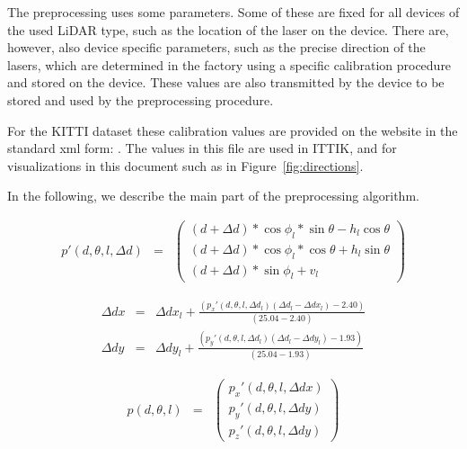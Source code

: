 \documentclass[english]{article}
\begin{document}
The preprocessing uses some parameters. Some of these are fixed for all
devices of the used LiDAR type, such as the location of the laser on the
device. There are, however, also device specific parameters, such as the
precise direction of the lasers, which are determined in the factory
using a specific calibration procedure and stored on the device. These
values are also transmitted by the device to be stored and used by the
preprocessing procedure.

For the KITTI dataset these calibration values are provided on the
website in the standard xml form:
. The values in
this file are used in ITTIK, and for visualizations in this document
such as in Figure~\ref{fig:directions}.

In the following, we describe the main part of the preprocessing
algorithm.

\begin{eqnarray}
  p'(d, \theta, l, \Delta d) &=& \left(
           \begin{array}{l}
             (d + \Delta d) * \cos{\phi_l} * \sin{\theta} - h_l \cos{\theta} \nonumber \\
             (d + \Delta d) * \cos{\phi_l} * \cos{\theta} + h_l \sin{\theta} \nonumber \\
             (d + \Delta d) * \sin{\phi_l} + v_l
           \end{array}
         \right)
\end{eqnarray}

\begin{eqnarray}
  \Delta dx &=& \Delta dx_l + \frac{(p_x'(d, \theta, l, \Delta d_l)(\Delta d_l - \Delta dx_l) - 2.40)}{(25.04 - 2.40)} \nonumber \\
  \Delta dy &=& \Delta dy_l + \frac{(p_y'(d, \theta, l, \Delta d_l)(\Delta d_l - \Delta dy_l) - 1.93)}{(25.04 - 1.93)} \nonumber
\end{eqnarray}

\begin{eqnarray}
  p(d, \theta, l) &=& \left(
           \begin{array}{l}
              p_x'(d, \theta, l, \Delta dx) \nonumber \\
              p_y'(d, \theta, l, \Delta dy) \nonumber \\
              p_z'(d, \theta, l, \Delta dy) \nonumber
           \end{array}
         \right)
\end{eqnarray}
\end{document}
